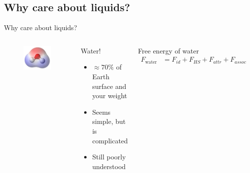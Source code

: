 \documentclass{beamer}
\begin{document}
\subsection*{Why care about liquids?}
\begin{frame}{Why care about liquids?}
		\begin{columns}[t, onlytextwidth]
			\begin{figure}
				\includegraphics[width=\textwidth]{figs/water.png}	
			\end{figure}
			\begin{block}{Water!}
			\begin{itemize}
				\item $\approx 70\%$ of Earth surface and your weight
				\item Seems simple, but is complicated
				\item Still poorly understood 
			\end{itemize}
			\end{block}
			\begin{block}{Free energy of water}
				\begin{align*}
					F_{\text{water}} &= F_{id} + F_{HS} + F_{attr} + F_{assoc} 
				\end{align*}
			\end{block}
		\end{columns}
\end{frame}
\end{document}
